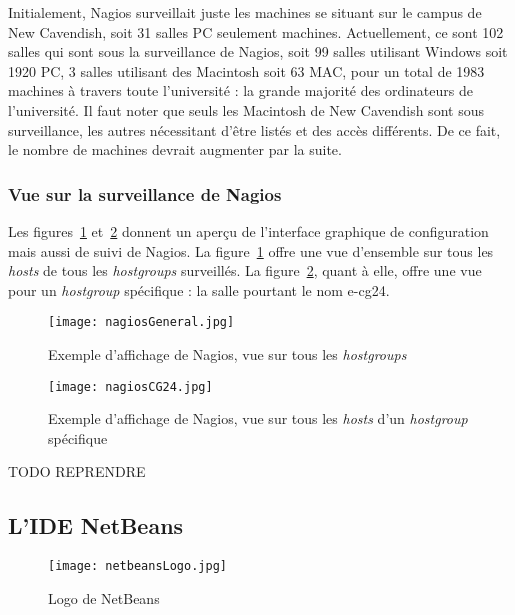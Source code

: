 Initialement, Nagios surveillait juste les machines se situant sur le campus de New Cavendish, soit 31 salles PC seulement machines.
Actuellement, ce sont 102 salles qui sont sous la surveillance de Nagios, soit 99 salles utilisant Windows soit 1920 PC, 3 salles utilisant des Macintosh soit 63 MAC, pour un total de 1983 machines \`a travers toute l'universit\'e : la grande majorit\'e des ordinateurs de l'universit\'e.
Il faut noter que seuls les Macintosh de New Cavendish sont sous surveillance, les autres n\'ecessitant d'\^etre list\'es et des acc\`es diff\'erents.
De ce fait, le nombre de machines devrait augmenter par la suite.

\subsubsection{Vue sur la surveillance de Nagios}

Les figures~\ref{figure:nagiosGeneral} et~\ref{figure:nagiosCG24}  donnent un aper\c{c}u de l'interface graphique de configuration mais aussi de suivi de Nagios.
La figure~\ref{figure:nagiosGeneral} offre une vue d'ensemble sur tous les  \textit{hosts} de tous les \textit{hostgroups} surveill\'es.
La figure~\ref{figure:nagiosCG24}, quant \`a elle, offre une vue pour un \textit{hostgroup} sp\'ecifique : la salle pourtant le nom \textsf{e-cg24}.

\begin{figure}[!ht]
	\centering
	\texttt{[image: nagiosGeneral.jpg]}
	\caption{Exemple d'affichage de Nagios, vue sur tous les \textit{hostgroups}}
	\label{figure:nagiosGeneral}
	
\end{figure}

\begin{figure}[!ht]
	\centering
	\texttt{[image: nagiosCG24.jpg]}
	\caption{Exemple d'affichage de Nagios, vue sur tous les \textit{hosts} d'un \textit{hostgroup} sp\'ecifique}
	\label{figure:nagiosCG24}
	
\end{figure}




TODO REPRENDRE

\subsection{L'IDE NetBeans}
\label{section:netbeans}

\begin{figure}[!ht]
	\centering
	\texttt{[image: netbeansLogo.jpg]}
	\caption{Logo de NetBeans}

\end{figure}

